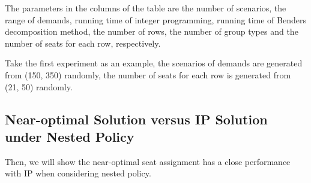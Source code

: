 The parameters in the columns of the table are the number of scenarios, the range of demands, running time of integer programming, running time of Benders decomposition method, the number of rows, the number of group types and the number of seats for each row, respectively. 

Take the first experiment as an example, the scenarios of demands are generated from (150, 350) randomly, the number of seats for each row is generated from (21, 50) randomly.




\subsection{Near-optimal Solution versus IP Solution under Nested Policy}
Then, we will show the near-optimal seat assignment has a close performance with IP when considering nested policy.


